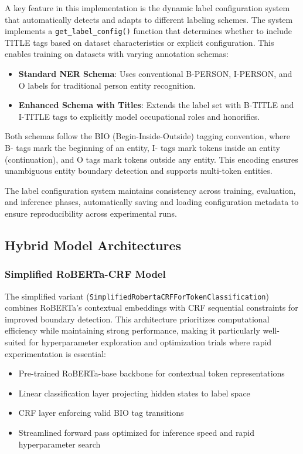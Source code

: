 \documentclass[a4paper]{usiinfbachelorproject}
\begin{document}
A key feature in this implementation is the dynamic label configuration system that automatically detects and adapts to different labeling schemes. The system implements a \texttt{get\_label\_config()} function that determines whether to include TITLE tags based on dataset characteristics or explicit configuration. This enables training on datasets with varying annotation schemas:

\begin{itemize}
    \item \textbf{Standard NER Schema}: Uses conventional B-PERSON, I-PERSON, and O labels for traditional person entity recognition.
    \item \textbf{Enhanced Schema with Titles}: Extends the label set with B-TITLE and I-TITLE tags to explicitly model occupational roles and honorifics.
\end{itemize}

Both schemas follow the BIO (Begin-Inside-Outside) tagging convention, where B- tags mark the beginning of an entity, I- tags mark tokens inside an entity (continuation), and O tags mark tokens outside any entity. This encoding ensures unambiguous entity boundary detection and supports multi-token entities.

The label configuration system maintains consistency across training, evaluation, and inference phases, automatically saving and loading configuration metadata to ensure reproducibility across experimental runs.

\subsection{Hybrid Model Architectures}

\subsubsection{Simplified RoBERTa-CRF Model}

The simplified variant (\texttt{SimplifiedRobertaCRFForTokenClassification}) combines RoBERTa's contextual embeddings with CRF sequential constraints for improved boundary detection. This architecture prioritizes computational efficiency while maintaining strong performance, making it particularly well-suited for hyperparameter exploration and optimization trials where rapid experimentation is essential:

\begin{itemize}
    \item Pre-trained RoBERTa-base backbone for contextual token representations
    \item Linear classification layer projecting hidden states to label space
    \item CRF layer enforcing valid BIO tag transitions
    \item Streamlined forward pass optimized for inference speed and rapid hyperparameter search
\end{itemize}
\end{document}
